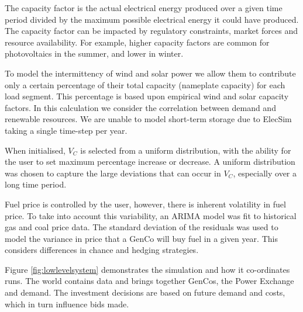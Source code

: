 The capacity factor is the actual electrical energy produced over a given time period divided by the maximum possible electrical energy it could have produced. The capacity factor can be impacted by regulatory constraints, market forces and resource availability. For example, higher capacity factors are common for photovoltaics in the summer, and lower in winter. 

To model the intermittency of wind and solar power we allow them to contribute only a certain percentage of their total capacity (nameplate capacity) for each load segment. This percentage is based upon empirical wind and solar capacity factors. In this calculation we consider the correlation between demand and renewable resources. We are unable to model short-term storage due to ElecSim taking a single time-step per year. 

When initialised, $V_C$ is selected from a uniform distribution, with the ability for the user to set maximum percentage increase or decrease. A uniform distribution was chosen to capture the large deviations that can occur in $V_C$, especially over a long time period. \vphantom{By doing this, the variance in costs between individual power plants for processes such as preventative and corrective maintenance, labour costs and skill, health and safety and chance are different per plant instant.}

Fuel price is controlled by the user, however, there is inherent volatility in fuel price. To take into account this variability, an ARIMA \cite{ARIMA} model was fit to historical gas and coal price data. The standard deviation of the residuals was used to model the variance in price that a GenCo will buy fuel in a given year. This considers differences in chance and hedging strategies.



Figure \ref{fig:lowlevelsystem} demonstrates the simulation and how it co-ordinates runs. The world contains data and brings together GenCos, the Power Exchange and demand. The investment decisions are based on future demand and costs, which in turn influence bids made.

